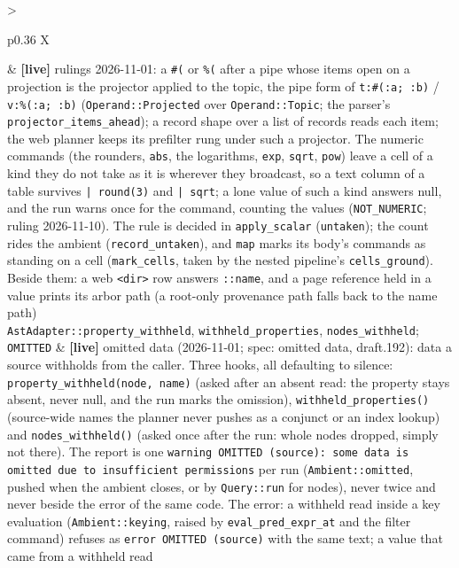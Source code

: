 \documentclass{report}
\newcommand{\live}{\textbf{\textcolor{blue!60!black}{[live]}}\xspace}
\begin{document}
\begin{xltabular}{\textwidth}{>{\raggedright\arraybackslash}p{0.36\textwidth} X}
  & \live rulings 2026-11-01: a \texttt{\#(} or \texttt{\%(} after a
    pipe whose items open on a projection is the projector applied
    to the topic, the pipe form of \texttt{t:\#(:a; :b)} /
    \texttt{v:\%(:a; :b)} (\texttt{Operand::Projected} over
    \texttt{Operand::Topic}; the parser's
    \texttt{projector\_items\_ahead}); a record shape over a list of
    records reads each item; the web planner keeps its prefilter
    rung under such a projector. The numeric commands (the
    rounders, \texttt{abs}, the logarithms, \texttt{exp},
    \texttt{sqrt}, \texttt{pow}) leave a cell of a kind they do not
    take as it is wherever they broadcast, so a text column of a
    table survives \texttt{| round(3)} and \texttt{| sqrt}; a lone
    value of such a kind answers null, and the run warns once for
    the command, counting the values (\texttt{NOT\_NUMERIC}; ruling
    2026-11-10). The rule is decided in \texttt{apply\_scalar}
    (\texttt{untaken}); the count rides the ambient
    (\texttt{record\_untaken}), and \texttt{map} marks its body's
    commands as standing on a cell (\texttt{mark\_cells}, taken by
    the nested pipeline's \texttt{cells\_ground}). Beside them: a web
    \texttt{<dir>} row answers \texttt{::name}, and a page reference
    held in a value prints its arbor path (a root-only provenance
    path falls back to the name path) \\
\texttt{AstAdapter::property\_withheld}, \texttt{withheld\_properties}, \texttt{nodes\_withheld}; \texttt{OMITTED}
  & \live omitted data (2026-11-01; spec: omitted data, draft.192):
    data a source withholds from the caller. Three hooks, all
    defaulting to silence: \texttt{property\_withheld(node, name)}
    (asked after an absent read: the property stays absent, never
    null, and the run marks the omission), \texttt{withheld\_properties()}
    (source-wide names the planner never pushes as a conjunct or an
    index lookup) and \texttt{nodes\_withheld()} (asked once after
    the run: whole nodes dropped, simply not there). The report is
    one \texttt{warning OMITTED (source): some data is omitted due to
    insufficient permissions} per run (\texttt{Ambient::omitted},
    pushed when the ambient closes, or by \texttt{Query::run} for
    nodes), never twice and never beside the error of the same code.
    The error: a withheld read inside a key evaluation
    (\texttt{Ambient::keying}, raised by \texttt{eval\_pred\_expr\_at}
    and the filter command) refuses as \texttt{error OMITTED (source)}
    with the same text; a value that came from a withheld read

\end{xltabular}
\end{document}
